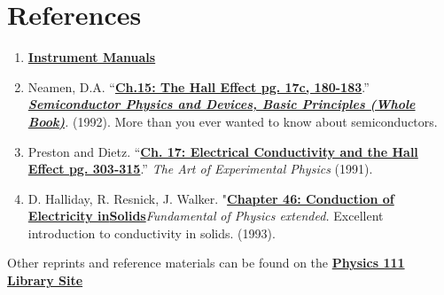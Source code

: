 \documentclass{../lab}
\begin{document}
\section{References}
\label{sec:References}

\begin{enumerate}
    \item \href{http://experimentationlab.berkeley.edu/node/106}{\textbf{Instrument Manuals}}

    \item Neamen, D.A. ``\href{http://physics111.lib.berkeley.edu/Physics111/Reprints/SHE/09-Semiconductors.pdf}{\textbf{Ch.15: The Hall Effect pg. 17c, 180-183}}.'' \emph{\href{http://physics111.lib.berkeley.edu/Physics111/Reprints/SHE/ch.5\%20carrier\%20transport\%20phenomena.pdf}{\textbf{Semiconductor Physics and Devices, Basic Principles (Whole Book)}}.} (1992). More than you ever wanted to know about semiconductors.

    \item Preston and Dietz. ``\href{http://physics111.lib.berkeley.edu/Physics111/Reprints/SHE/07-Electrical\_Conductivity.pdf}{\textbf{Ch. 17: Electrical Conductivity and the Hall Effect pg. 303-315}}.'' \emph{The Art of Experimental Physics} (1991).

    \item D. Halliday, R. Resnick, J. Walker. "\href{http://physics111.lib.berkeley.edu/Physics111/Reprints/SHE/Halliday\_Resnick/Ch.\%2046\%20Conduction\%20of\%20electricity\%20in\%20solids.pdf}{\textbf{Chapter 46: Conduction of Electricity in}}\href{http://physics111.lib.berkeley.edu/Physics111/Reprints/SHE/Halliday\_Resnick/Ch.\%2046\%20Conduction\%20of\%20electricity\%20in\%20solids.pdf}{\textbf{Solids}}\emph{Fundamental}\emph{ of Physics extended.} Excellent introduction to conductivity in solids. (1993).

\end{enumerate}

\noindent Other reprints and reference materials can be found on the \href{http://physics111.lib.berkeley.edu/Physics111/Reprints/SHE/SHE\_index.html}{\textbf{Physics 111 Library Site}}
\end{document}
